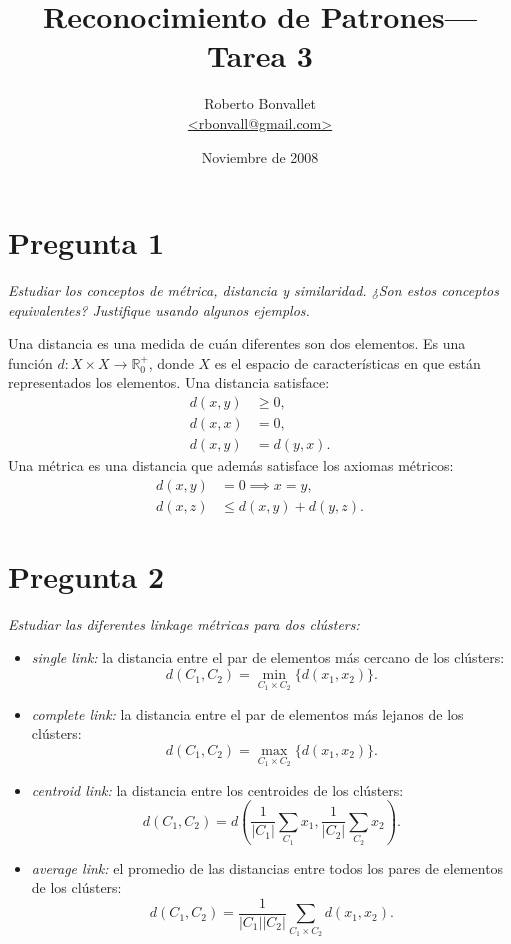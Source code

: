 \documentclass[spanish]{article}
\title{Reconocimiento de Patrones---Tarea 3}
\author{Roberto Bonvallet \\ \url {<rbonvall@gmail.com>}}
\date{Noviembre de 2008}
\newcommand{\pregunta}{\textit}
\newcommand{\card}[1]{\lvert#1\rvert}
\newcommand{\R}{\mathbb{R}}
\begin{document}
\maketitle

\section*{Pregunta 1}
\pregunta{
    Estudiar los conceptos de métrica, distancia y similaridad.
    ¿Son estos conceptos equivalentes?
    Justifique usando algunos ejemplos.
}

Una distancia es una medida de cuán diferentes son dos elementos.  Es una
función $d:X\times X\to\R_0^+$, donde $X$ es el espacio de características en
que están representados los elementos.  Una distancia satisface\footnotemark:
\begin{align*}
    d(x, y) &\ge 0, \\ d(x, x) &= 0, \\ d(x, y) &= d(y, x).
\end{align*}
Una métrica es una distancia que además satisface los axiomas métricos:
\begin{align*}
    d(x, y) &= 0\implies x = y, \\
    d(x, z) &\le d(x, y) + d(y, z).
\end{align*}







\section*{Pregunta 2}
\pregunta{Estudiar las diferentes linkage métricas para dos clústers:}
\begin{itemize}
    \item \pregunta{single link:} la distancia entre el par de elementos más cercano de los
        clústers:
        \[d(C_1, C_2) = \min_{C_1\times C_2}\bigl\{d(x_1, x_2)\bigr\}.\]
    \item \pregunta{complete link:} la distancia entre el par de elementos más lejanos de los
        clústers:
        \[d(C_1, C_2) = \max_{C_1\times C_2}\bigl\{d(x_1, x_2)\bigr\}.\]
    \item \pregunta{centroid link:} la distancia entre los centroides de los clústers:
        \[d(C_1, C_2) = d\left(\frac{1}{\card{C_1}}\sum_{C_1} x_1, \frac{1}{\card{C_2}}\sum_{C_2} x_2\right).\]
    \item \pregunta{average link:} el promedio de las distancias entre todos los pares de elementos
        de los clústers:
        \[d(C_1, C_2) = \frac{1}{\card{C_1}\card{C_2}}\sum_{C_1\times C_2} d(x_1, x_2).\]
\end{itemize}
\end{document}
